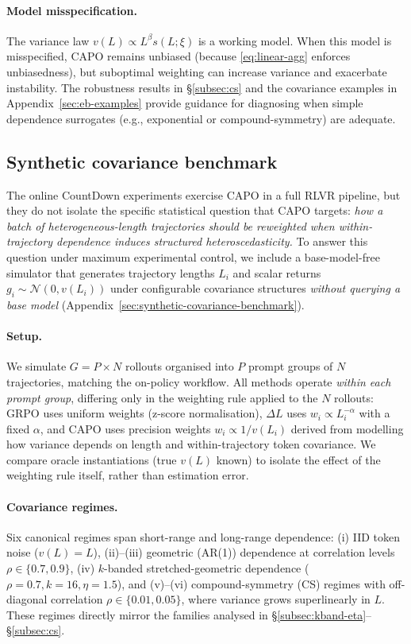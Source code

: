 \paragraph{Model misspecification.}
The variance law $v(L)\propto L^{\beta}s(L;\xi)$ is a working model.
When this model is misspecified, CAPO remains unbiased (because \eqref{eq:linear-agg} enforces unbiasedness), but suboptimal weighting can increase variance and exacerbate instability.
The robustness results in \S\ref{subsec:cs} and the covariance examples in Appendix~\ref{sec:eb-examples} provide guidance for diagnosing when simple dependence surrogates (e.g., exponential or compound-symmetry) are adequate.


\subsection{Synthetic covariance benchmark}\label{subsec:synthetic-benchmark}

The online CountDown experiments exercise CAPO in a full RLVR pipeline, but they do not isolate the specific statistical question that CAPO targets: \emph{how a batch of heterogeneous-length trajectories should be reweighted when within-trajectory dependence induces structured heteroscedasticity.}
To answer this question under maximum experimental control, we include a base-model-free simulator that generates trajectory lengths $L_i$ and scalar returns $g_i \sim \mathcal{N}(0, v(L_i))$ under configurable covariance structures \emph{without querying a base model} (Appendix~\ref{sec:synthetic-covariance-benchmark}).

\paragraph{Setup.}
We simulate $G = P \times N$ rollouts organised into $P$ prompt groups of $N$ trajectories, matching the on-policy workflow.
All methods operate \emph{within each prompt group}, differing only in the weighting rule applied to the $N$ rollouts:
GRPO uses uniform weights (z-score normalisation), $\Delta L$ uses $w_i \propto L_i^{-\alpha}$ with a fixed $\alpha$, and CAPO uses precision weights $w_i \propto 1/v(L_i)$ derived from modelling how variance depends on length and within-trajectory token covariance.
We compare oracle instantiations (true $v(L)$ known) to isolate the effect of the weighting rule itself, rather than estimation error.

\paragraph{Covariance regimes.}
Six canonical regimes span short-range and long-range dependence:
(i) IID token noise ($v(L) = L$),
(ii)--(iii) geometric (AR(1)) dependence at correlation levels $\rho \in \{0.7, 0.9\}$,
(iv) $k$-banded stretched-geometric dependence ($\rho=0.7, k=16, \eta=1.5$), and
(v)--(vi) compound-symmetry (CS) regimes with off-diagonal correlation $\rho \in \{0.01, 0.05\}$, where variance grows superlinearly in $L$.
These regimes directly mirror the families analysed in \S\ref{subsec:kband-eta}--\S\ref{subsec:cs}.

